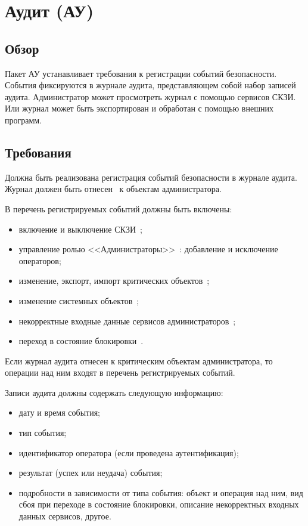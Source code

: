 \section{Аудит (АУ)}\label{AU}

\subsection{Обзор}\label{AU.Defs}

Пакет АУ устанавливает требования к регистрации событий безопасности.
События фиксируются в журнале аудита, представляющем собой набор 
записей аудита.
%
Администратор может просмотреть журнал с помощью сервисов СКЗИ.
Или журнал может быть экспортирован и обработан с помощью внешних программ.

\subsection{Требования}\label{AU.Reqs}


\label{R.AU.Log} %
Должна быть реализована регистрация событий безопасности в журнале аудита. 
Журнал должен быть отнесен~ к объектам администратора.

\label{R.AU.Events} %
В перечень регистрируемых событий должны быть включены:
\begin{itemize} 
\item
включение и выключение СКЗИ~;
\item
управление ролью <<Администраторы>>~: 
добавление и исключение операторов; 
\item
изменение, экспорт, импорт критических объектов~; 
\item
изменение системных объектов~; 
\item
некорректные входные данные сервисов администраторов~;
\item
переход в состояние блокировки~.
\end{itemize}

\begin{note*}
Если журнал аудита отнесен к критическим объектам администратора, 
то операции над ним входят в перечень регистрируемых событий.
\end{note*}

\label{R.AU.Records} %
Записи аудита должны содержать следующую информацию:
\begin{itemize} 
\item
дату и время события;
\item
тип события; 
\item
идентификатор оператора (если проведена аутентификация); 
\item
результат (успех или неудача) события; 
\item
подробности в зависимости от типа события:
объект и операция над ним,
вид сбоя при переходе в состояние блокировки,
описание некорректных входных данных сервисов,
другое.
\end{itemize}

